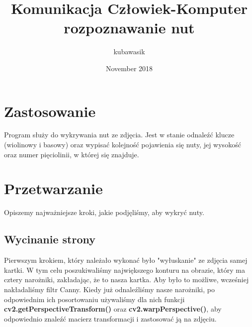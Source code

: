 \documentclass[11pt]{article}
\title{Komunikacja Człowiek-Komputer \newline rozpoznawanie nut}
\author{kubawasik }
\date{November 2018}
\begin{document}
\maketitle

\section{Zastosowanie}


Program służy do wykrywania nut ze zdjęcia.
Jest w stanie odnaleźć klucze (wiolinowy i basowy) oraz wypisać kolejność pojawienia się nuty, jej wysokość oraz numer pięciolinii, w której się znajduje.  

\section{Przetwarzanie}

Opiszemy najważniejsze kroki, jakie podjęliśmy, aby wykryć nuty.

\subsection{Wycinanie strony}

Pierwszym krokiem, który należało wykonać było "wyłuskanie" ze zdjęcia samej kartki. 
W tym celu poszukiwaliśmy największego konturu na obrazie, który ma cztery narożniki, zakładając, że to nasza kartka. 
Aby było to możliwe, wcześniej nakładaliśmy filtr Canny. 
Kiedy już odnaleźliśmy nasze narożniki, po odpowiednim ich posortowaniu używaliśmy dla nich funkcji \textbf{cv2.getPerspectiveTransform()}
oraz \textbf{cv2.warpPerspective()}, aby odpowiednio znaleźć macierz transformacji i zastosować ją na zdjęciu. 
\end{document}
